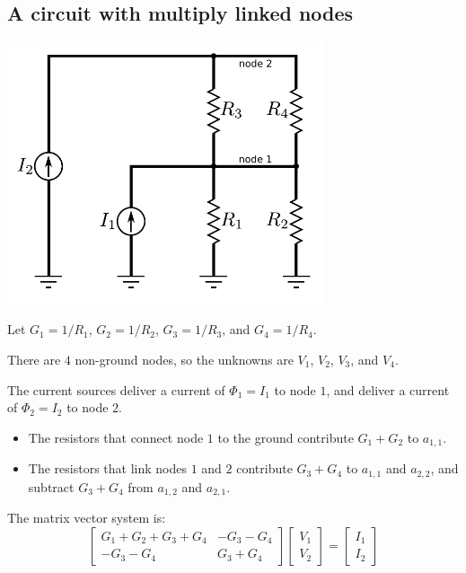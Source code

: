 \documentclass{article}
\begin{document}
\subsection{A circuit with multiply linked nodes}

\parbox{0.7\textwidth}{
\includegraphics[width = 0.7\textwidth]{complex_circuit_1}
}

Let \(G_1 = 1/R_1\), \(G_2 = 1/R_2\), \(G_3 = 1/R_3\), and \(G_4 = 1/R_4\).                 

There are \(4\) non-ground nodes, so the unknowns are \(V_1\), \(V_2\), \(V_3\), and \(V_4\). 

The current sources deliver a current of \(\Phi_1 = I_1\) to node \(1\), and deliver a current of \(\Phi_2 = I_2\) to node \(2\).

\begin{itemize} 
\item The resistors that connect node \(1\) to the ground contribute \(G_1 + G_2\) to \(a_{1,1}\). 
\item The resistors that link nodes \(1\) and \(2\) contribute \(G_3 + G_4\) to \(a_{1,1}\) and \(a_{2,2}\), and subtract \(G_3 + G_4\) from \(a_{1,2}\) and \(a_{2,1}\). 
\end{itemize}

The matrix vector system is:
\[\begin{bmatrix} G_1 + G_2 + G_3 + G_4 & -G_3 - G_4 \\ -G_3 - G_4 & G_3 + G_4 \end{bmatrix}
\begin{bmatrix} V_1 \\ V_2 \end{bmatrix} = 
\begin{bmatrix} I_1 \\ I_2 \end{bmatrix}\]
\end{document}

